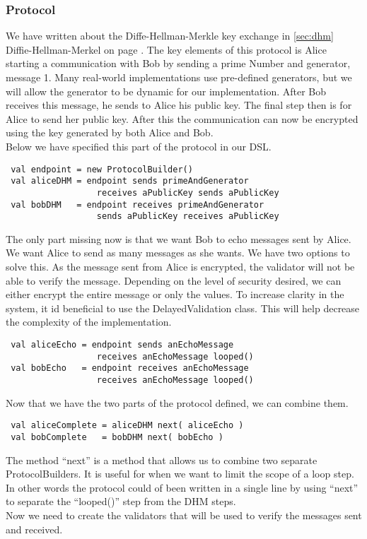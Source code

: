 \subsubsection{Protocol}
We have written about the Diffe-Hellman-Merkle key exchange in \ref{sec:dhm} Diffie-Hellman-Merkel on page \pageref{sec:dhm}. The key elements of this protocol is Alice starting a communication with Bob by sending a prime Number and generator, message 1. Many real-world implementations use pre-defined generators, but we will allow the generator to be dynamic for our implementation. After Bob receives this message, he sends to Alice his public key. The final step then is for Alice to send her public key. After this the communication can now be encrypted using the key generated by both Alice and Bob.
\\ 
Below we have specified this part of the protocol in our DSL.
\begin{lstlisting}
 val endpoint = new ProtocolBuilder()
 val aliceDHM = endpoint sends primeAndGenerator 
                  receives aPublicKey sends aPublicKey
 val bobDHM   = endpoint receives primeAndGenerator 
                  sends aPublicKey receives aPublicKey
\end{lstlisting}
The only part missing now is that we want Bob to echo messages sent by Alice. We want Alice to send as many messages as she wants. We have two options to solve this. As the message sent from Alice is encrypted, the validator will not be able to verify the message. Depending on the level of security desired, we can either encrypt the entire message or only the values. To increase clarity in the system, it id beneficial to use the DelayedValidation class. This will help decrease the complexity of the implementation.

\begin{lstlisting}
 val aliceEcho = endpoint sends anEchoMessage 
                  receives anEchoMessage looped()
 val bobEcho   = endpoint receives anEchoMessage
                  receives anEchoMessage looped()
\end{lstlisting}

Now that we have the two parts of the protocol defined, we can combine them.
\begin{lstlisting}
 val aliceComplete = aliceDHM next( aliceEcho )
 val bobComplete   = bobDHM next( bobEcho )
\end{lstlisting}
The method ``next'' is a method that allows us to combine two separate ProtocolBuilders. It is useful for when we want to limit the scope of a loop step. In other words the protocol could of been written in a single line by using ``next'' to separate the ``looped()'' step from the DHM steps.
\\
Now we need to create the validators that will be used to verify the messages sent and received.

